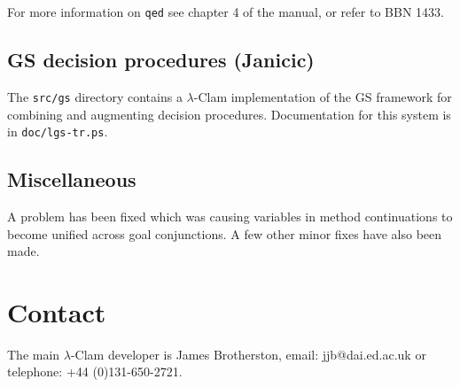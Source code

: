 \documentclass[11pt]{article}
\begin{document}
For more information on {\tt qed} see chapter 4 of the manual, or
refer to BBN 1433.

\subsection{GS decision procedures (Janicic)}
The {\tt src/gs} directory contains a $\lambda$-Clam implementation
of the GS framework for combining and augmenting decision procedures.
Documentation for this system is in {\tt doc/lgs-tr.ps}.

\subsection{Miscellaneous}
A problem has been fixed which was causing variables in method
continuations to become unified across goal conjunctions.  A few other
minor fixes have also been made.

\section{Contact}
The main $\lambda$-Clam developer is James Brotherston, email:
jjb@dai.ed.ac.uk or telephone: +44 (0)131-650-2721.
\end{document}
